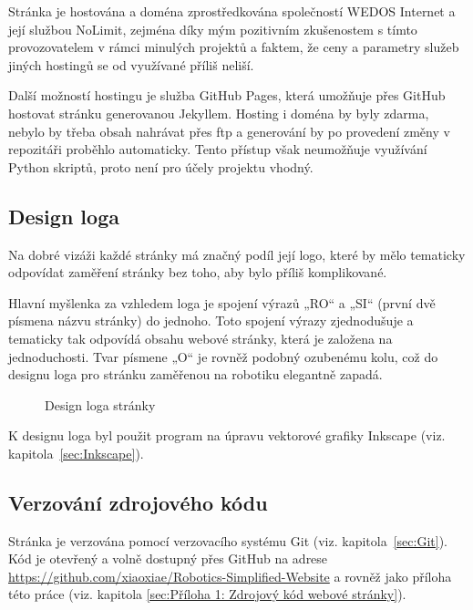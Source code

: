 \documentclass[a4paper, 12pt]{article}
\begin{document}
  Stránka je hostována a doména zprostředkována společností WEDOS Internet a její službou NoLimit, zejména díky mým pozitivním zkušenostem s tímto provozovatelem v rámci minulých projektů a faktem, že ceny a parametry služeb jiných hostingů se od využívané příliš neliší.

  Další možností hostingu je služba GitHub Pages, která umožňuje přes GitHub hostovat stránku generovanou Jekyllem. Hosting i doména by byly zdarma, nebylo by třeba obsah nahrávat přes \acrshort{ftp} a generování by po provedení změny v repozitáři proběhlo automaticky. Tento přístup však neumožňuje využívání Python skriptů, proto není pro účely projektu vhodný.


  \subsection{Design loga}
  Na dobré vizáži každé stránky má značný podíl její logo, které by mělo tematicky odpovídat zaměření stránky bez toho, aby bylo příliš komplikované.

  Hlavní myšlenka za vzhledem loga je spojení výrazů „RO“ a „SI“ (první dvě písmena názvu stránky) do jednoho. Toto spojení výrazy zjednodušuje a tematicky tak odpovídá obsahu webové stránky, která je založena na jednoduchosti. Tvar písmene „O“ je rovněž podobný ozubenému kolu, což do designu loga pro stránku zaměřenou na robotiku elegantně zapadá.

  \begin{figure}[H]%
    \centering

    \hfill
    \hfill

    \caption{Design loga stránky}%
    \label{img:Design loga stránky}%
  \end{figure}

  K designu loga byl použit program na úpravu vektorové grafiky Inkscape (viz. kapitola~\ref{sec:Inkscape}).


  \subsection{Verzování zdrojového kódu}
  Stránka je verzována pomocí verzovacího systému Git (viz. kapitola~\ref{sec:Git}). Kód je otevřený a volně dostupný přes GitHub na adrese \url{https://github.com/xiaoxiae/Robotics-Simplified-Website} a rovněž jako příloha této práce (viz. kapitola \ref{sec:Příloha 1: Zdrojový kód webové stránky}).
\end{document}
